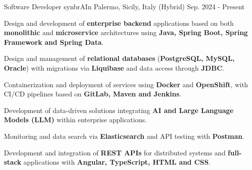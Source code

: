 
\begin{cventries}

  \cventry
    {Software Developer}
    {synbrAIn}
    {Palermo, Sicily, Italy (Hybrid)}
    {Sep. 2024 - Present}
    {
      \begin{cvitems}
        \item {Design and development of \textbf{enterprise backend} applications based on both \textbf{monolithic} and \textbf{microservice} architectures using \textbf{Java, Spring Boot, Spring Framework and Spring Data}.}
        \item {Design and management of \textbf{relational databases} (\textbf{PostgreSQL, MySQL, Oracle}) with migrations via \textbf{Liquibase} and data access through \textbf{JDBC}.}
        \item {Containerization and deployment of services using \textbf{Docker} and \textbf{OpenShift}, with CI/CD pipelines based on \textbf{GitLab, Maven and Jenkins}.}
        \item {Development of data-driven solutions integrating \textbf{AI and Large Language Models (LLM)} within enterprise applications.}
        \item {Monitoring and data search via \textbf{Elasticsearch} and API testing with \textbf{Postman}.}
        \item {Development and integration of \textbf{REST APIs} for distributed systems and \textbf{full-stack} applications with \textbf{Angular, TypeScript, HTML and CSS}.}
        \\
      \end{cvitems}
    }


\end{cventries}
